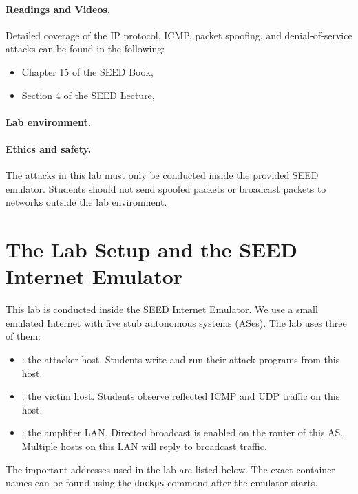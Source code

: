 \paragraph{Readings and Videos.}
Detailed coverage of the IP protocol, ICMP, packet spoofing, and denial-of-service
attacks can be found in the following:

\begin{itemize}
\item Chapter 15 of the SEED Book, \seedbook
\item Section 4 of the SEED Lecture, \seedisvideo
\end{itemize}


\paragraph{Lab environment.}
\seedenvironmentB
\nodependency


\paragraph{Ethics and safety.}
The attacks in this lab must only be conducted inside the provided SEED
emulator. Students should not send spoofed packets or broadcast packets to
networks outside the lab environment.


\section{The Lab Setup and the SEED Internet Emulator}

This lab is conducted inside the SEED Internet Emulator. We use a small
emulated Internet with five stub autonomous systems (ASes). The lab uses three
of them:

\begin{itemize}[noitemsep]
\item \attacker: the attacker host. Students write and run their attack programs
      from this host.
\item \victim: the victim host. Students observe reflected ICMP and UDP traffic
      on this host.
\item \amplifier: the amplifier LAN. Directed broadcast is enabled on the router
      of this AS. Multiple hosts on this LAN will reply to broadcast traffic.
\end{itemize}

The important addresses used in the lab are listed below. The exact container
names can be found using the \texttt{dockps} command after the emulator starts.

